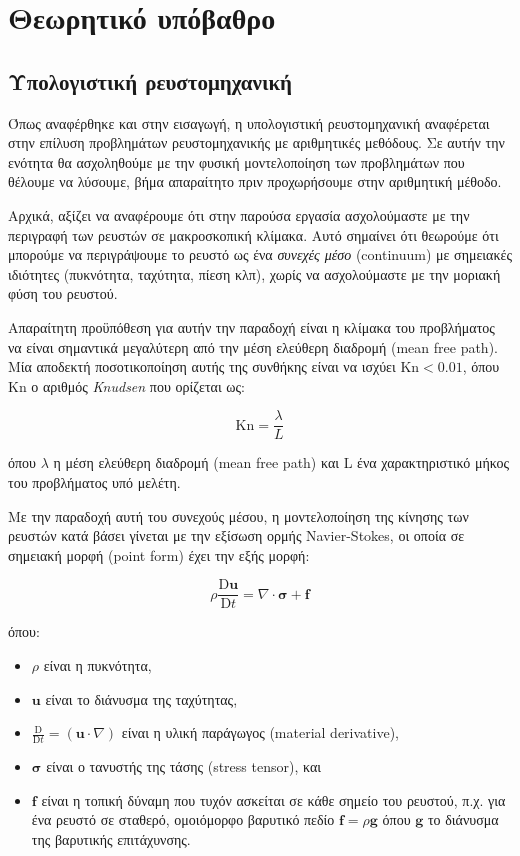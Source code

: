\chapter{Θεωρητικό υπόβαθρο}
\label{chapter:theory}

\section{Υπολογιστική ρευστομηχανική}

Όπως αναφέρθηκε και στην εισαγωγή, η υπολογιστική ρευστομηχανική αναφέρεται στην επίλυση προβλημάτων ρευστομηχανικής με αριθμητικές μεθόδους.
Σε αυτήν την ενότητα θα ασχοληθούμε με την φυσική μοντελοποίηση των προβλημάτων που θέλουμε να λύσουμε, βήμα απαραίτητο πριν προχωρήσουμε στην αριθμητική μέθοδο.

Αρχικά, αξίζει να αναφέρουμε ότι στην παρούσα εργασία ασχολούμαστε με την περιγραφή των ρευστών σε μακροσκοπική κλίμακα.
Αυτό σημαίνει ότι θεωρούμε ότι μπορούμε να περιγράψουμε το ρευστό ως ένα \emph{συνεχές μέσο} (continuum) με σημειακές ιδιότητες (πυκνότητα, ταχύτητα, πίεση κλπ), χωρίς να ασχολούμαστε με την μοριακή φύση του ρευστού.

Απαραίτητη προϋπόθεση για αυτήν την παραδοχή είναι η κλίμακα του προβλήματος να είναι σημαντικά μεγαλύτερη από την μέση ελεύθερη διαδρομή (mean free path).
Μία αποδεκτή ποσοτικοποίηση αυτής της συνθήκης είναι να ισχύει $\mathrm{Kn} < 0.01$, όπου $\mathrm{Kn}$ ο αριθμός \emph{Knudsen} που ορίζεται ως:

\begin{equation*}
    \mathrm{Kn} = \frac{\lambda}{L}
\end{equation*}

όπου $\lambda$ η μέση ελεύθερη διαδρομή (mean free path) και L ένα χαρακτηριστικό μήκος του προβλήματος υπό μελέτη.

Με την παραδοχή αυτή του συνεχούς μέσου, η μοντελοποίηση της κίνησης των ρευστών κατά βάσει γίνεται με την εξίσωση ορμής Navier-Stokes, οι οποία σε σημειακή μορφή (point form) έχει την εξής μορφή:

\begin{equation}
    \rho \frac{\mathrm{D} \mathbf{u}}{\mathrm{D}t} = \nabla \cdot \mathbf{\sigma} + \mathbf{f}
    \label{eq:cauchy}
\end{equation}

όπου:

\begin{itemize}
    \item $\rho$ είναι η πυκνότητα,
    \item $\mathbf{u}$ είναι το διάνυσμα της ταχύτητας,
    \item $\frac{\mathrm{D}}{\mathrm{D}t} = (\mathbf{u} \cdot \nabla )$ είναι η υλική παράγωγος (material derivative),
    \item $\mathbf{\sigma}$ είναι ο τανυστής της τάσης (stress tensor), και
    \item $\mathbf{f}$ είναι η τοπική δύναμη που τυχόν ασκείται σε κάθε σημείο του ρευστού, π.χ. για ένα ρευστό σε σταθερό, ομοιόμορφο βαρυτικό πεδίο $\mathbf{f} = \rho \mathbf{g}$ όπου $\mathbf{g}$ το διάνυσμα της βαρυτικής επιτάχυνσης.
\end{itemize}

